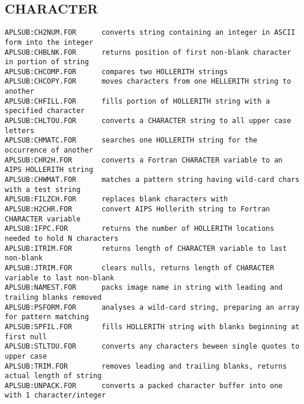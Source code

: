 \subsection{CHARACTER}
\begin{verbatim}
APLSUB:CH2NUM.FOR      converts string containing an integer in ASCII form into the integer
APLSUB:CHBLNK.FOR      returns position of first non-blank character in portion of string
APLSUB:CHCOMP.FOR      compares two HOLLERITH strings
APLSUB:CHCOPY.FOR      moves characters from one HELLERITH string to another
APLSUB:CHFILL.FOR      fills portion of HOLLERITH string with a specified character
APLSUB:CHLTOU.FOR      converts a CHARACTER string to all upper case letters
APLSUB:CHMATC.FOR      searches one HOLLERITH string for the occurrence of another
APLSUB:CHR2H.FOR       converts a Fortran CHARACTER variable to an AIPS HOLLERITH string
APLSUB:CHWMAT.FOR      matches a pattern string having wild-card chars with a test string
APLSUB:FILZCH.FOR      replaces blank characters with
APLSUB:H2CHR.FOR       convert AIPS Hollerith string to Fortran CHARACTER variable
APLSUB:IFPC.FOR        returns the number of HOLLERITH locations needed to hold N characters
APLSUB:ITRIM.FOR       returns length of CHARACTER variable to last non-blank
APLSUB:JTRIM.FOR       clears nulls, returns length of CHARACTER variable to last non-blank
APLSUB:NAMEST.FOR      packs image name in string with leading and trailing blanks removed
APLSUB:PSFORM.FOR      analyses a wild-card string, preparing an array for pattern matching
APLSUB:SPFIL.FOR       fills HOLLERITH string with blanks beginning at first null
APLSUB:STLTOU.FOR      converts any characters beween single quotes to upper case
APLSUB:TRIM.FOR        removes leading and trailing blanks, returns actual length of string
APLSUB:UNPACK.FOR      converts a packed character buffer into one with 1 character/integer
\end{verbatim}
 
